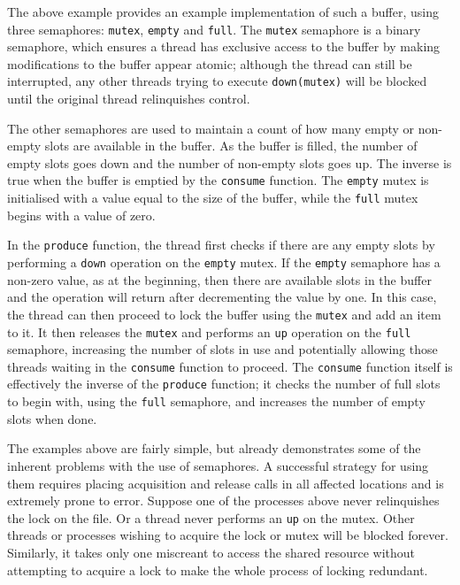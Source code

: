The above example provides an example implementation of such a buffer,
using three semaphores: \texttt{mutex}, \texttt{empty} and
\texttt{full}.  The \texttt{mutex} semaphore is a binary semaphore,
which ensures a thread has exclusive access to the buffer by making
modifications to the buffer appear atomic; although the thread can
still be interrupted, any other threads trying to execute
\texttt{down(mutex)} will be blocked until the original thread
relinquishes control.

The other semaphores are used to maintain a count of how many empty or
non-empty slots are available in the buffer.  As the buffer is filled,
the number of empty slots goes down and the number of non-empty slots
goes up.  The inverse is true when the buffer is emptied by the
\texttt{consume} function.  The \texttt{empty} mutex is initialised
with a value equal to the size of the buffer, while the \texttt{full}
mutex begins with a value of zero.

In the \texttt{produce} function, the thread first checks if there are
any empty slots by performing a \texttt{down} operation on the
\texttt{empty} mutex.  If the \texttt{empty} semaphore has a non-zero
value, as at the beginning, then there are available slots in the
buffer and the operation will return after decrementing the value by
one.  In this case, the thread can then proceed to lock the buffer
using the \texttt{mutex} and add an item to it.  It then releases the
\texttt{mutex} and performs an \texttt{up} operation on the
\texttt{full} semaphore, increasing the number of slots in use and
potentially allowing those threads waiting in the \texttt{consume}
function to proceed.  The \texttt{consume} function itself is
effectively the inverse of the \texttt{produce} function; it checks
the number of full slots to begin with, using the \texttt{full}
semaphore, and increases the number of empty slots when done.

The examples above are fairly simple, but already demonstrates some of
the inherent problems with the use of semaphores.  A successful
strategy for using them requires placing acquisition and release calls
in all affected locations and is extremely prone to error.  Suppose
one of the processes above never relinquishes the lock on the file.
Or a thread never performs an \texttt{up} on the mutex.  Other threads
or processes wishing to acquire the lock or mutex will be blocked
forever.  Similarly, it takes only one miscreant to access the shared
resource without attempting to acquire a lock to make the whole
process of locking redundant.

